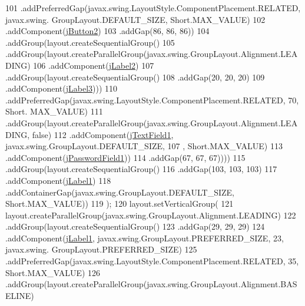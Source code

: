 \begin{DoxyCode}
101                         .addPreferredGap(javax.swing.LayoutStyle.ComponentPlacement.RELATED, javax.swing.
      GroupLayout.DEFAULT\_SIZE, Short.MAX\_VALUE)
102                         .addComponent(\mbox{\hyperlink{class_interfaz_package_1_1_interfaz_inicio_a0b17a44506b3f0598b3edabaae5099ec}{jButton2}})
103                         .addGap(86, 86, 86))
104                     .addGroup(layout.createSequentialGroup()
105                         .addGroup(layout.createParallelGroup(javax.swing.GroupLayout.Alignment.LEADING)
106                             .addComponent(\mbox{\hyperlink{class_interfaz_package_1_1_interfaz_inicio_a57d053ea1c64fdb320d8930aaf4861e9}{jLabel2}})
107                             .addGroup(layout.createSequentialGroup()
108                                 .addGap(20, 20, 20)
109                                 .addComponent(\mbox{\hyperlink{class_interfaz_package_1_1_interfaz_inicio_a680b59c8dabd737e6017bcb2fb35d93a}{jLabel3}})))
110                         .addPreferredGap(javax.swing.LayoutStyle.ComponentPlacement.RELATED, 70, Short.
      MAX\_VALUE)
111                         .addGroup(layout.createParallelGroup(javax.swing.GroupLayout.Alignment.LEADING, \textcolor{keyword}{
      false})
112                             .addComponent(\mbox{\hyperlink{class_interfaz_package_1_1_interfaz_inicio_a6c0a79d5c225c996fd8e03141682afe7}{jTextField1}}, javax.swing.GroupLayout.DEFAULT\_SIZE, 107
      , Short.MAX\_VALUE)
113                             .addComponent(\mbox{\hyperlink{class_interfaz_package_1_1_interfaz_inicio_a8fde0bb0a462417298eaf6468976a838}{jPasswordField1}}))
114                         .addGap(67, 67, 67))))
115             .addGroup(layout.createSequentialGroup()
116                 .addGap(103, 103, 103)
117                 .addComponent(\mbox{\hyperlink{class_interfaz_package_1_1_interfaz_inicio_a6fa5563033504d87402e1abe1b520bc2}{jLabel1}})
118                 .addContainerGap(javax.swing.GroupLayout.DEFAULT\_SIZE, Short.MAX\_VALUE))
119         );
120         layout.setVerticalGroup(
121             layout.createParallelGroup(javax.swing.GroupLayout.Alignment.LEADING)
122             .addGroup(layout.createSequentialGroup()
123                 .addGap(29, 29, 29)
124                 .addComponent(\mbox{\hyperlink{class_interfaz_package_1_1_interfaz_inicio_a6fa5563033504d87402e1abe1b520bc2}{jLabel1}}, javax.swing.GroupLayout.PREFERRED\_SIZE, 23, javax.swing.
      GroupLayout.PREFERRED\_SIZE)
125                 .addPreferredGap(javax.swing.LayoutStyle.ComponentPlacement.RELATED, 35, Short.MAX\_VALUE)
126                 .addGroup(layout.createParallelGroup(javax.swing.GroupLayout.Alignment.BASELINE)

\end{DoxyCode}
